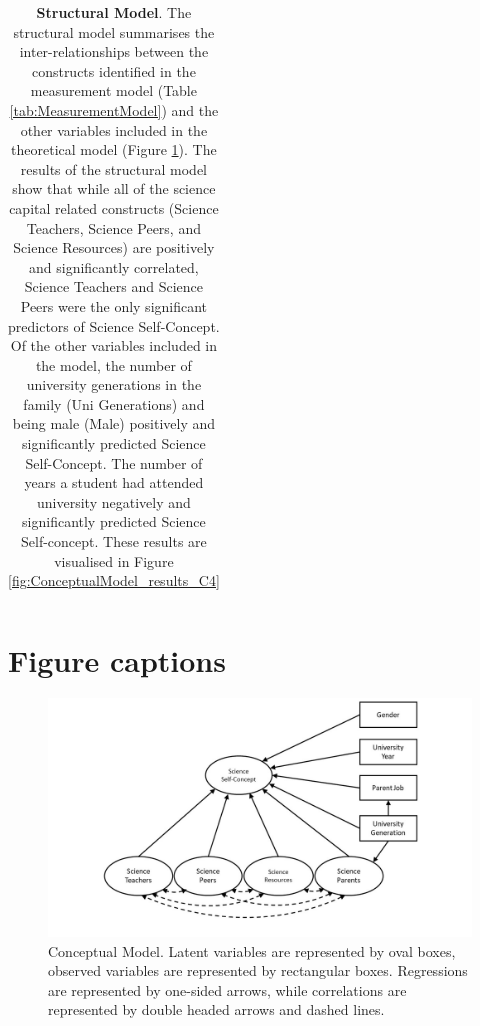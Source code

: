 \begin{landscape}
\begin{table}[ht]
\begin{tabular}{llrrrrr}
   \hline
\end{tabular}
\caption{\textbf{Structural Model}. The structural model summarises the inter-relationships between the constructs identified in the measurement model (Table \ref{tab:MeasurementModel}) and the other variables included in the theoretical model (Figure  \ref{fig:ConceptualModel_C4}). The results of the structural model show that while all of the science capital related constructs (Science Teachers, Science Peers, and Science Resources) are positively and significantly correlated, Science Teachers and Science Peers were the only significant predictors of Science Self-Concept. Of the other variables included in the model, the number of university generations in the family (Uni Generations) and being male (Male) positively and significantly predicted Science Self-Concept. The number of years a student had attended university negatively and significantly predicted Science Self-concept. These results are visualised in Figure \ref{fig:ConceptualModel_results_C4} }
\label{tab:StructuralModel}
\end{table}
\end{landscape}

\section*{Figure captions}


\begin{figure}
 \includegraphics[width = \linewidth]{C4 - Science Capital Self-Concept/ConceptualModel.jpg}
\caption{Conceptual Model. Latent variables are represented by oval boxes, observed variables are represented by rectangular boxes. Regressions are represented by one-sided arrows, while correlations are represented by double headed arrows and dashed lines. }
\label{fig:ConceptualModel_C4}       
\end{figure}

